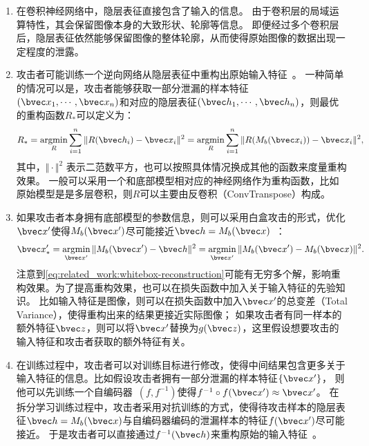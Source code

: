 \begin{enumerate}[label=(\arabic*)]
    \item 在卷积神经网络中，隐层表征直接包含了输入的信息\cite{abuadbba2020can_split}。
    由于卷积层的局域运算特性，其会保留图像本身的大致形状、轮廓等信息。
    即便经过多个卷积层后，隐层表征依然能够保留图像的整体轮廓，从而使得原始图像的数据出现一定程度的泄露。
    \item 攻击者可能训练一个逆向网络从隐层表征中重构出原始输入特征~\cite{vepakomma2020nopeek,hezecheng_2019_model_inversion_attack}。
    一种简单的情况可以是，攻击者能够获取一部分泄漏的样本特征$(\bvec x_1, \cdots, \bvec x_n)$和对应的隐层表征$(\bvec h_1, \cdots, \bvec h_n)$，则最优的重构函数$R_*$可以定义为：
    \begin{equation}
        R_* = \mathop{\text{argmin}}_{R} \sum_{i=1}^n \Vert R(\bvec h_i) - \bvec x_i\Vert^2 = 
        \mathop{\text{argmin}}_{R} \sum_{i=1}^n \Vert R(M_b(\bvec x_i)) - \bvec x_i\Vert^2,
    \end{equation}
    其中，$\Vert \cdot\Vert^2$ 表示二范数平方，也可以按照具体情况换成其他的函数来度量重构效果。
    一般可以采用一个和底部模型相对应的神经网络作为重构函数，比如原始模型是是多层卷积，则$R$可以主要由反卷积（ConvTranspose）构成。
    \item 如果攻击者本身拥有底部模型的参数信息，则可以采用白盒攻击的形式，优化$\bvec x'$使得$M_b(\bvec x')$尽可能接近$\bvec h = M_b(\bvec x)$~\cite{hezecheng_2019_model_inversion_attack,luoxinjian2021feature_attack}：
    \begin{equation}
    \label{eq:related_work:whitebox-reconstruction}
        \bvec x'_* = \mathop{\text{argmin}}_{\bvec x'} \Vert M_b(\bvec x') - \bvec h\Vert^2 = \mathop{\text{argmin}}_{\bvec x'} \Vert M_b(\bvec x') - M_b(\bvec x)\Vert^2.
    \end{equation}
    注意到\autoref{eq:related_work:whitebox-reconstruction}可能有无穷多个解，影响重构效果。为了提高重构效果，也可以在损失函数中加入关于输入特征的先验知识。
    比如输入特征是图像，则可以在损失函数中加入$\bvec x'$的总变差（Total Variance），使得重构出来的结果更接近实际图像；
    如果攻击者有同一样本的额外特征$\bvec z$，则可以将$\bvec x'$替换为$g(\bvec z)$，这里假设想要攻击的输入特征和攻击者获取的额外特征有关。
    \item 在训练过程中，攻击者可以对训练目标进行修改，使得中间结果包含更多关于输入特征的信息。比如假设攻击者拥有一部分泄漏的样本特征$\{ \bvec x' \}$，
    则他可以先训练一个自编码器~\cite{kramer1991autoencoder,baldi2012autoencoders}$(f,f^{-1})$使得$f^{-1}\circ f(\bvec x')\approx \bvec x'$。
    在拆分学习训练过程中，攻击者采用对抗训练的方式，使得待攻击样本的隐层表征$\bvec h = M_b(\bvec x)$与自编码器编码的泄漏样本的特征$f(\bvec x')$尽可能接近。
    于是攻击者可以直接通过$f^{-1}(\bvec h)$来重构原始的输入特征~\cite{pasquini2921inference_attack_tiger}。
\end{enumerate}

